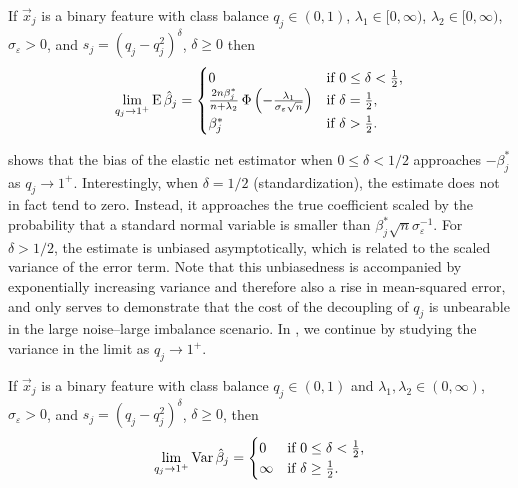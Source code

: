 \begin{theorem}
  \label{thm:classbalance-bias}
  If \(\vec{x}_j\) is a binary feature with class balance \(q_j \in (0, 1)\), \(\lambda_1 \in [0,\infty)\), \(\lambda_2 \in [0,\infty)\), \(\sigma_\varepsilon > 0\), and \(s_j = (q_j - q_j^2)^{\delta}\), \(\delta \geq 0\)  then
  \[
    \lim_{q_j \rightarrow 1^+} \operatorname{E} \hat{\beta}_j =
    \begin{cases}
      0                                                                                                  & \text{if } 0 \leq \delta < \frac{1}{2}, \\
      \frac{2n \beta_j^*}{n + \lambda_2} \operatorname{\Phi}\left(-\frac{\lambda_1}{\sigma_\varepsilon \sqrt{n}}\right) & \text{if } \delta = \frac{1}{2},        \\
      \beta^*_j                                                                                          & \text{if } \delta > \frac{1}{2}.
    \end{cases}
  \]
\end{theorem}

 shows that the bias of the elastic net estimator when \(0 \leq
\delta < 1/2\) approaches \(-\beta_j^*\) as \(q_j \rightarrow 1^+\). Interestingly, when
\(\delta = 1/2\) (standardization), the estimate does not in fact tend to zero. Instead, it
approaches the true coefficient scaled by the probability that a standard normal variable
is smaller than \(\beta_j^*\sqrt{n}\sigma_\varepsilon^{-1}\). For \(\delta > 1/2\), the
estimate is unbiased asymptotically, which is related to the scaled variance of the error
term. Note that this unbiasedness is accompanied by exponentially increasing variance and
therefore also a rise in mean-squared error, and only serves to demonstrate that the cost
of the decoupling of \(q_j\) is unbearable in the large noise--large imbalance scenario. In
, we continue by studying the variance in the limit as
\(q_j \rightarrow 1^+\).

\begin{theorem}
  \label{thm:classbalance-variance}
  If \(\vec{x}_j\) is a binary feature with class balance \(q_j \in (0, 1)\) and \(\lambda_1,\lambda_2 \in (0,\infty)\), \(\sigma_\varepsilon > 0\), and \(s_j = (q_j - q_j^2)^{\delta}\), \(\delta \geq 0\), then
  \[
    \lim_{q_j \rightarrow 1^+} \operatorname{Var} \hat{\beta}_j =
    \begin{cases}
      0      & \text{if } 0 \leq \delta < \frac{1}{2}, \\
      \infty & \text{if } \delta \geq \frac{1}{2}.
    \end{cases}
  \]
\end{theorem}

